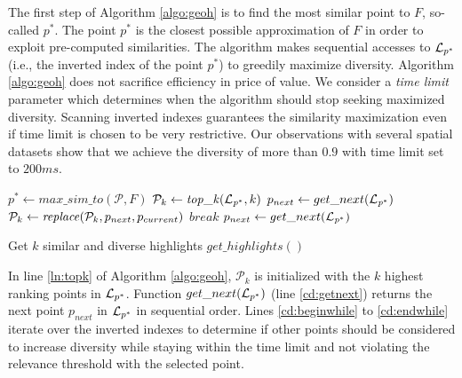 \vspace{2pt}
The first step of Algorithm \ref{algo:geoh} is to find the most similar point to $F$, so-called $p^*$. The point $p^*$ is the closest possible approximation of $F$ in order to exploit pre-computed similarities. The algorithm makes sequential accesses to ${\cal L}_{p^*}$ (i.e., the inverted index of the point $p^*$) to greedily maximize diversity. Algorithm \ref{algo:geoh} does not sacrifice efficiency in price of value. We consider a {\em time limit} parameter which determines when the algorithm should stop seeking maximized diversity. Scanning inverted indexes guarantees the similarity maximization even if time limit is chosen to be very restrictive. Our observations with several spatial datasets show that we achieve the diversity of more than $0.9$ with time limit set to $200ms$.


\begin{algorithm}[t]
\DontPrintSemicolon
{}
$p^* \gets \mathit{max\_sim\_to}(\mathcal{P},F)$\;
$\mathcal{P}_k \gets \mathit{top\_k}(\mathit{{\cal L}_{p^*}},k)$\label{ln:topk}\;
$p_{next} \gets get\_next(\mathit{{\cal L}_{p^*}})$\;\label{cd:getnext}
       {\label{cd:beginwhile}
              {
                     {\label{cd:betterdiv}
                     ${\cal P}_k \gets \mathit{replace}({\cal P}_k,p_{next},p_{current})$\;
                            $break$\;
                     }
              }
              $p_{next} \gets get\_next(\mathit{{\cal L}_{p^*}})$\;}\label{cd:endwhile}
       \; 
       \caption{Get $k$ similar and diverse highlights $\mathit{get\_highlights}()$}
       \label{algo:geoh}
\end{algorithm}

\vspace{2pt}
In line \ref{ln:topk} of Algorithm \ref{algo:geoh}, $\mathcal{P}_k$ is initialized with the $k$ highest ranking points in ${\cal L}_{p^*}$. Function $get\_next({\cal L}_{p^*})$ (line \ref{cd:getnext}) returns the next point $p_{next}$ in ${\cal L}_{p^*}$ in sequential order. Lines \ref{cd:beginwhile} to \ref{cd:endwhile} iterate over the inverted indexes to determine if other points should be considered to increase diversity while staying within the time limit and not violating the relevance threshold with the selected point.

